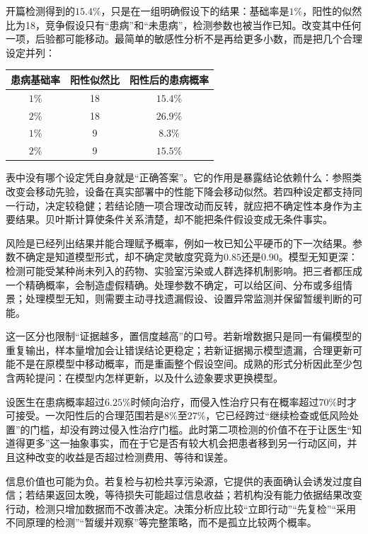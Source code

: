 开篇检测得到的$15.4\%$，只是在一组明确假设下的结果：基础率是$1\%$，阳性的似然比为18，竞争假设只有“患病”和“未患病”，检测参数也被当作已知。改变其中任何一项，后验都可能移动。最简单的敏感性分析不是再给更多小数，而是把几个合理设定并列：

\begin{center}
\begin{tabular}{ccc}
\toprule
患病基础率 & 阳性似然比 & 阳性后的患病概率\\
\midrule
$1\%$ & 18 & $15.4\%$\\
$2\%$ & 18 & $26.9\%$\\
$1\%$ & 9  & $8.3\%$\\
$2\%$ & 9  & $15.5\%$\\
\bottomrule
\end{tabular}
\end{center}

表中没有哪个设定凭自身就是“正确答案”。它的作用是暴露结论依赖什么：参照类改变会移动先验，设备在真实部署中的性能下降会移动似然。若四种设定都支持同一行动，决定较稳健；若结论随一项合理改动而反转，就应把不确定性本身作为主要结果。贝叶斯计算使条件关系清楚，却不能把条件假设变成无条件事实\parencite{howson2006}。

风险是已经列出结果并能合理赋予概率，例如一枚已知公平硬币的下一次结果。参数不确定是知道模型形式，却不确定灵敏度究竟为$0.85$还是$0.90$。模型无知更深：检测可能受某种尚未列入的药物、实验室污染或人群选择机制影响。把三者都压成一个精确概率，会制造虚假精确。处理参数不确定，可以给区间、分布或多组情景；处理模型无知，则需要主动寻找遗漏假设、设置异常监测并保留暂缓判断的可能。

这一区分也限制“证据越多，置信度越高”的口号。若新增数据只是同一有偏模型的重复输出，样本量增加会让错误结论更稳定；若新证据揭示模型遗漏，合理更新可能不是在原模型中移动概率，而是重画整个假设空间。成熟的形式分析因此至少包含两轮提问：在模型内怎样更新，以及什么迹象要求更换模型。

设医生在患病概率超过$6.25\%$时倾向治疗，而侵入性治疗只有在概率超过$70\%$时才可接受。一次阳性后的合理范围若是$8\%$至$27\%$，它已经跨过“继续检查或低风险处置”的门槛，却没有跨过侵入性治疗门槛。此时第二项检测的价值不在于让医生“知道得更多”这一抽象事实，而在于它是否有较大机会把患者移到另一行动区间，并且这种改变的收益是否超过检测费用、等待和误差。

信息价值也可能为负。若复检与初检共享污染源，它提供的表面确认会诱发过度自信；若结果返回太晚，等待损失可能超过信息收益；若机构没有能力依据结果改变行动，检测只增加数据而不改善决定。决策分析应比较“立即行动”“先复检”“采用不同原理的检测”“暂缓并观察”等完整策略，而不是孤立比较两个概率\parencite{jeffrey1983}。

